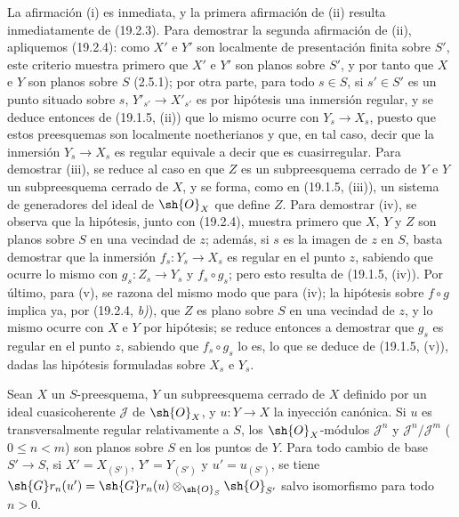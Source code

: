 La afirmación (i) es inmediata, y la primera afirmación de (ii) resulta inmediatamente de (19.2.3). Para demostrar la segunda afirmación de (ii), apliquemos (19.2.4): como $X'$ e $Y'$ son localmente de presentación finita sobre $S'$, este criterio muestra primero que $X'$ e $Y'$ son planos sobre $S'$, y por tanto que $X$ e $Y$ son planos sobre $S$ (2.5.1); por otra parte, para todo $s\in S$, si $s'\in S'$ es un punto situado sobre $s$, $Y'_{s'}\to X'_{s'}$ es por hipótesis una inmersión regular, y se deduce entonces de (19.1.5, (ii)) que lo mismo ocurre con $Y_s\to X_s$, puesto que estos preesquemas son localmente noetherianos y que, en tal caso, decir que la inmersión $Y_s\to X_s$ es regular equivale a decir que es cuasirregular. Para demostrar (iii), se reduce al caso en que $Z$ es un subpreesquema cerrado de $Y$ e $Y$ un subpreesquema cerrado de $X$, y se forma, como en (19.1.5, (iii)), un sistema de generadores del ideal de $\sh{O}_X$ que define $Z$. Para demostrar (iv), se observa que la hipótesis, junto con (19.2.4), muestra primero que $X$, $Y$ y $Z$ son planos sobre $S$ en una vecindad de $z$; además, si $s$ es la imagen de $z$ en $S$, basta demostrar que la inmersión $f_s:Y_s\to X_s$ es regular en el punto $z$, sabiendo que ocurre lo mismo con $g_s:Z_s\to Y_s$ y $f_s\circ g_s$; pero esto resulta de (19.1.5, (iv)). Por último, para (v), se razona del mismo modo que para (iv); la hipótesis sobre $f\circ g$ implica ya, por (19.2.4, \emph{b)}), que $Z$ es plano sobre $S$ en una vecindad de $z$, y lo mismo ocurre con $X$ e $Y$ por hipótesis; se reduce entonces a demostrar que $g_s$ es regular en el punto $z$, sabiendo que $f_s\circ g_s$ lo es, lo que se deduce de (19.1.5, (v)), dadas las hipótesis formuladas sobre $X_s$ e $Y_s$.


\begin{proposition}[19.2.8]
\label{IV.19.2.8}
Sean $X$ un $S$-preesquema, $Y$ un subpreesquema cerrado de $X$ definido por un ideal cuasicoherente $\mathscr J$ de $\sh{O}_X$, y $u:Y\to X$ la inyección canónica. Si $u$ es transversalmente regular relativamente a $S$, los $\sh{O}_X$-módulos $\mathscr J^n$ y $\mathscr J^n/\mathscr J^m$ \textup{(}$0\leq n<m$\textup{)} son planos sobre $S$ en los puntos de $Y$. Para todo cambio de base $S'\to S$, si $X'=X_{(S')}$, $Y'=Y_{(S')}$ y $u'=u_{(S')}$, se tiene
$\sh{G}r_n(u')=\sh{G}r_n(u)\otimes_{\sh{O}_S}\sh{O}_{S'}$
salvo isomorfismo para todo $n>0$.
\end{proposition}


